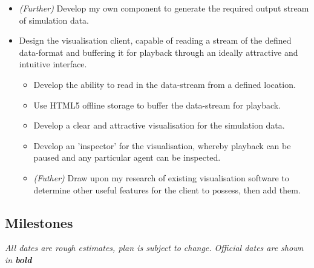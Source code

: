 \documentclass[a4paper]{article}
\begin{document}
\begin{itemize}
\begin{itemize}
					\end{itemize}

				\item \textit{(Further)} Develop my own component to generate the required output stream of simulation data.

				\item Design the visualisation client, capable of reading a stream of the defined data-format and buffering it for playback through an ideally attractive and intuitive interface.

					\begin{itemize}

						\item Develop the ability to read in the data-stream from a defined location.
						\item Use \textsc{HTML5} offline storage to buffer the data-stream for playback.
						\item Develop a clear and attractive visualisation for the simulation data.
						\item Develop an 'inspector' for the visualisation, whereby playback can be paused and any particular agent can be inspected.
						\item \textit{(Futher)} Draw upon my research of existing visualisation software to determine other useful features for the client to possess, then add them.

					\end{itemize}

			\end{itemize}

			\vfill

		\subsection{Milestones}

			\textit{\small{All dates are rough estimates, plan is subject to change. Official dates are shown in \textbf{bold}}}\\
\end{document}
